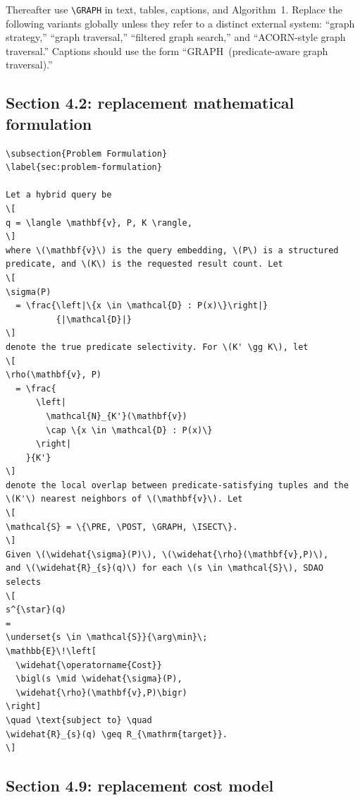 \documentclass[11pt]{article}
\newcommand{\PRE}{\textsc{PRE}}
\newcommand{\POST}{\textsc{POST}}
\newcommand{\GRAPH}{\textsc{GRAPH}}
\newcommand{\ISECT}{\textsc{ISECT}}
\begin{document}
Thereafter use \verb|\GRAPH| in text, tables, captions, and Algorithm~1.
Replace the following variants globally unless they refer to a distinct
external system: ``graph strategy,'' ``graph traversal,'' ``filtered graph
search,'' and ``ACORN-style graph traversal.'' Captions should use the form
``\GRAPH\ (predicate-aware graph traversal).''

\subsection*{Section 4.2: replacement mathematical formulation}
\label{sec:problem-formulation}

\begin{verbatim}
\subsection{Problem Formulation}
\label{sec:problem-formulation}

Let a hybrid query be
\[
q = \langle \mathbf{v}, P, K \rangle,
\]
where \(\mathbf{v}\) is the query embedding, \(P\) is a structured
predicate, and \(K\) is the requested result count. Let
\[
\sigma(P)
  = \frac{\left|\{x \in \mathcal{D} : P(x)\}\right|}
          {|\mathcal{D}|}
\]
denote the true predicate selectivity. For \(K' \gg K\), let
\[
\rho(\mathbf{v}, P)
  = \frac{
      \left|
        \mathcal{N}_{K'}(\mathbf{v})
        \cap \{x \in \mathcal{D} : P(x)\}
      \right|
    }{K'}
\]
denote the local overlap between predicate-satisfying tuples and the
\(K'\) nearest neighbors of \(\mathbf{v}\). Let
\[
\mathcal{S} = \{\PRE, \POST, \GRAPH, \ISECT\}.
\]
Given \(\widehat{\sigma}(P)\), \(\widehat{\rho}(\mathbf{v},P)\),
and \(\widehat{R}_{s}(q)\) for each \(s \in \mathcal{S}\), SDAO selects
\[
s^{\star}(q)
=
\underset{s \in \mathcal{S}}{\arg\min}\;
\mathbb{E}\!\left[
  \widehat{\operatorname{Cost}}
  \bigl(s \mid \widehat{\sigma}(P),
  \widehat{\rho}(\mathbf{v},P)\bigr)
\right]
\quad \text{subject to} \quad
\widehat{R}_{s}(q) \geq R_{\mathrm{target}}.
\]
\end{verbatim}

\subsection*{Section 4.9: replacement cost model}
\label{sec:cost-model}
\end{document}
